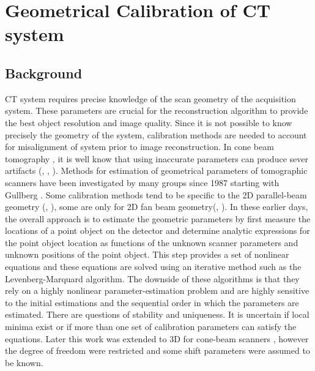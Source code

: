 \chapter{Geometrical Calibration of CT system}
\label{chap:calibration}

\section{Background}
CT system requires precise knowledge of the scan geometry of the acquisition system.  These parameters are crucial for the reconstruction algorithm to provide the best object resolution and image quality.  Since it is not possible to know precisely the geometry of the system, calibration methods are needed to account for misalignment of system prior to image reconstruction.  In cone beam tomography , it is well know that using inaccurate parameters can produce sever artifacts (\citep{Li1994a}, \citep{Li1994b}, \citep{Wang1998}). Methods for estimation of geometrical parameters of tomographic scanners have been investigated by many groups since 1987 starting with Gullberg \citep{Gullberg1987}.  Some calibration methods tend to be specific to the 2D parallel-beam geometry (\citep{Azevedo1990}, \citep{Busemann1987}), some are only for 2D fan beam geometry(\citep{Crawford1988}, \citep{Hsieh1999} \citep{Gullberg1987}).  In these earlier days, the overall approach is to estimate the geometric parameters by first measure the locations of a point object on the detector and determine analytic expressions for the point object location as functions of the unknown scanner parameters and unknown positions of the point object.  This step provides a set of nonlinear equations and these equations are solved using an iterative method such as the Levenberg-Marquard algorithm.  The downside of these algorithms is that they rely on a highly nonlinear parameter-estimation problem and are highly sensitive to the initial estimations and the sequential order in which the parameters are estimated.  There are questions of stability and uniqueness.  It is uncertain if local minima exist or if more than one set of calibration parameters can satisfy the equations.  Later this work was extended to 3D for cone-beam scanners \citep{Gullberg1990}, however the degree of freedom were restricted and some shift parameters were assumed to be known.


